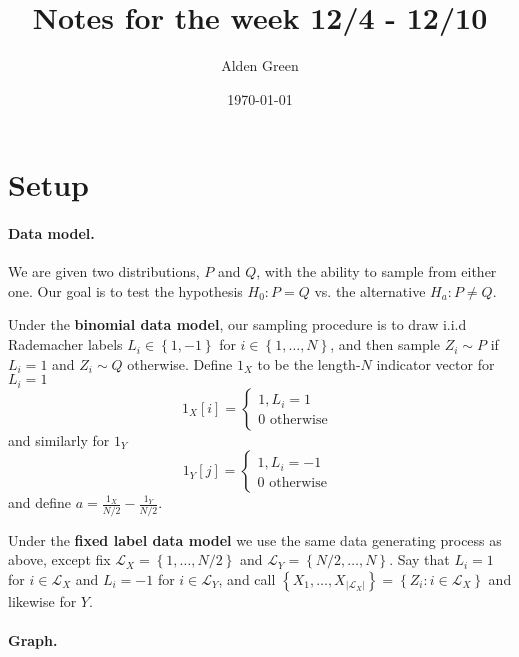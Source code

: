 \documentclass{article}
\newcommand{\abs}[1]{\left \lvert #1 \right \rvert}
\newcommand{\set}[1]{\left\{#1\right\}}
\newcommand{\Lx}{\mathcal{L}_X}
\theoremstyle{alden}
\theoremstyle{definition}
\theoremstyle{remark}
\begin{document}
	
\title{Notes for the week 12/4 - 12/10}
\author{Alden Green}
\date{\today}
\maketitle

\section{Setup}

\paragraph{Data model.}

We are given two distributions, $P$ and $Q$, with the ability to sample from either one. Our goal is to test the hypothesis $H_0: P = Q$ vs. the alternative $H_a: P \neq Q$. 

Under the \textbf{binomial data model}, our sampling procedure is to draw i.i.d Rademacher labels $L_i \in \set{1, -1}$ for $i \in \set{1, \ldots, N}$, and then sample 
$Z_i \sim P$ if $L_i = 1$ and $Z_i \sim Q$ otherwise. Define $1_X$ to be the length-$N$ indicator vector for $L_i = 1$
\begin{equation*}
1_X[i] = 
\begin{cases}
1, L_i = 1\\
0 \text{ otherwise } 
\end{cases}
\end{equation*}
and similarly for $1_Y$
\begin{equation*}
1_Y[j] = 
\begin{cases}
1, L_i= -1 \\
0 \text{ otherwise } 
\end{cases}
\end{equation*}
and define $a = \frac{1_X}{N / 2} - \frac{1_Y}{N / 2}$. 

Under the \textbf{fixed label data model} we use the same data generating process as above, except fix $\mathcal{L}_X = \set{1, \ldots, N/2}$ and $\mathcal{L}_Y = \set{N/2, \ldots, N}$. Say that $L_i = 1$ for $i \in \mathcal{L}_X$ and $L_i = -1$ for $i \in \mathcal{L}_Y$, and call $\set{ X_1, \ldots, X_{\abs{\Lx}} } = \set{Z_i: i \in \mathcal{L}_X}$ and likewise for $Y$.

\paragraph{Graph.}
\end{document}
